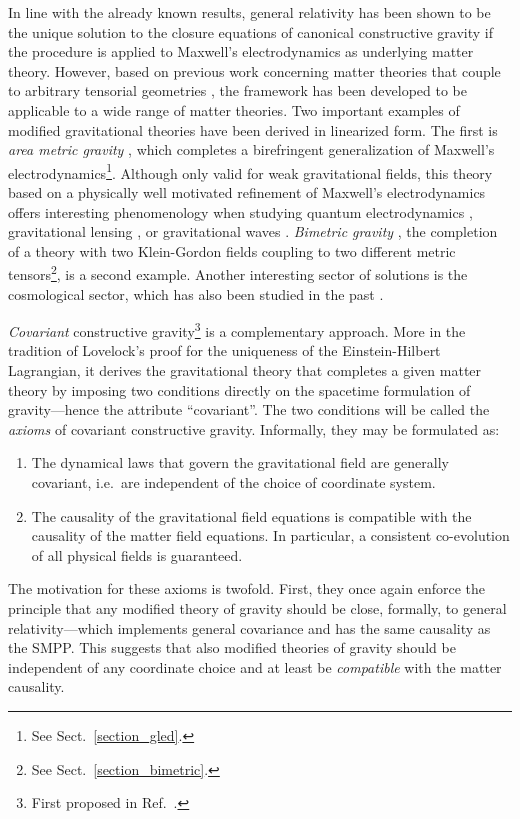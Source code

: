 In line with the already known results, general relativity has been shown to be the unique solution to the closure equations of canonical constructive gravity if the procedure is applied to Maxwell's electrodynamics as underlying matter theory. \cite{} However, based on previous work concerning matter theories that couple to arbitrary tensorial geometries \cite{sergio_phd}, the framework has been developed to be applicable to a wide range of matter theories. Two important examples of modified gravitational theories have been derived in linearized form. The first is \emph{area metric gravity} \cite{linear_area_paper}, which completes a birefringent generalization of Maxwell's electrodynamics\footnote{See Sect.~\ref{section_gled}.}. Although only valid for weak gravitational fields, this theory based on a physically well motivated refinement of Maxwell's electrodynamics offers interesting phenomenology when studying quantum electrodynamics \cite{roberto_paper}, gravitational lensing \cite{frederic_marcus_paper}, or gravitational waves \cite{nils_alex_mg15}. \emph{Bimetric gravity} \cite{bimetric_paper}, the completion of a theory with two Klein-Gordon fields coupling to two different metric tensors\footnote{See Sect.~\ref{section_bimetric}.}, is a second example. Another interesting sector of solutions is the cosmological sector, which has also been studied in the past \cite{max_phd(paper)}.

\emph{Covariant} constructive gravity\footnote{First proposed in Ref.~\cite{ccg_paper}.} is a complementary approach. More in the tradition of Lovelock's proof \cite{lovelock} for the uniqueness of the Einstein-Hilbert Lagrangian, it derives the gravitational theory that completes a given matter theory by imposing two conditions directly on the spacetime formulation of gravity---hence the attribute ``covariant''. The two conditions will be called the \emph{axioms} of covariant constructive gravity. Informally, they may be formulated as:
\begin{enumerate}
  \item The dynamical laws that govern the gravitational field are generally covariant, i.e.~are independent of the choice of coordinate system.
  \item The causality of the gravitational field equations is compatible with the causality of the matter field equations. In particular, a consistent co-evolution of all physical fields is guaranteed.
\end{enumerate}
The motivation for these axioms is twofold. First, they once again enforce the principle that any modified theory of gravity should be close, formally, to general relativity---which implements general covariance and has the same causality as the SMPP. This suggests that also modified theories of gravity should be independent of any coordinate choice and at least be \emph{compatible} with the matter causality.

